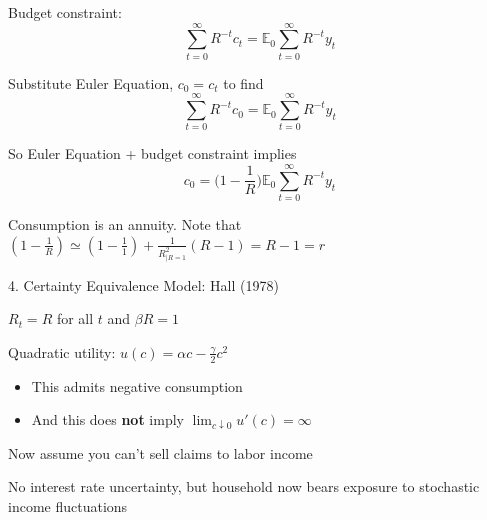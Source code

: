\documentclass[11pt, aspectratio=169]{beamer}
\newenvironment{witemize}{\itemize\addtolength{\itemsep}{10pt}}{\enditemize}
\begin{document}
\begin{frame}{}

\begin{witemize}
\item Budget constraint:
\begin{equation*}
	\sum_{t=0}^{\infty} R^{-t} c_t = \mathbb E_0 \sum_{t=0}^{\infty} R^{-t} y_t 
\end{equation*}

\item Substitute Euler Equation, $c_0 = c_t$ to find 
\begin{equation*}
	\sum_{t=0}^{\infty} R^{-t} c_0 = \mathbb E_0 \sum_{t=0}^\infty R^{-t} y_t 
\end{equation*}

\item So Euler Equation + budget constraint implies 
\begin{equation*}
	c_0 = \bigg(1 - \frac{1}{R}\bigg) \mathbb E_0 \sum_{t=0}^\infty R^{-t} y_t
\end{equation*}

\item Consumption is an annuity. Note that $(1-\frac{1}{R}) \simeq (1-\frac{1}{1}) +\frac{1}{R_{|R=1}^{2}}(R-1)=R-1=r$

\end{witemize}
\end{frame}



\begin{frame}{4. Certainty Equivalence Model: Hall (1978)}

\begin{witemize}
\item $R_t = R$ for all $t$ and $\beta R = 1$

\item Quadratic utility: $u(c) = \alpha c - \frac{\gamma}{2} c^2$

\begin{itemize}
\item This admits negative consumption

\item And this does \textbf{not} imply $\lim_{c\downarrow 0} u'(c) = \infty$
\end{itemize}

\item Now assume you can't sell claims to labor income

\item No interest rate uncertainty, but household now bears exposure to stochastic income fluctuations
\end{witemize}
\end{frame}
\end{document}
